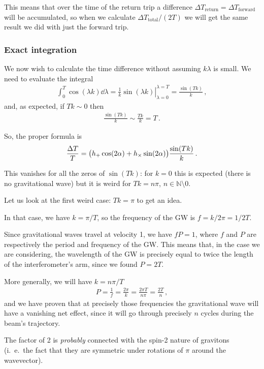 \documentclass[main.tex]{subfiles}
\begin{document}
This means that over the time of the return trip a difference \(\Delta T _{\text{return}} = \Delta T _{\text{forward}}\) will be accumulated, so when we calculate \(\Delta T _{\text{total}} / (2T)\) we will get the same result we did with just the forward trip. 

\subsubsection{Exact integration}

We now wish to calculate the time difference without assuming \(k \lambda \) is small. We need to evaluate the integral 
%
\begin{align}
\int_{0}^{T} \cos(\lambda k) \dd{\lambda } 
= \left. \frac{1}{k} \sin(\lambda k ) \right\vert_{\lambda = 0}^{\lambda = T} = \frac{\sin(Tk)}{k} 
\,,
\end{align}
%
and, as expected, if \(Tk \sim 0\) then 
%
\begin{align}
\frac{\sin(Tk)}{k} \sim \frac{Tk}{k} = T
\,.
\end{align}

So, the proper formula is 
%
\begin{align}
\frac{\Delta T}{T} = 
\qty(h_{+} \cos(2 \alpha ) + h_{ \times } \sin(2 \alpha ))
\frac{\sin(Tk)}{k}
\,.
\end{align}

This vanishes for all the zeros of \(\sin(Tk)\): for \(k=0\) this is expected (there is no gravitational wave) but it is weird for \(Tk = n \pi \), \(n \in \mathbb{N} \setminus \qty{0}\). 

Let us look at the first weird case: \(Tk = \pi \) to get an idea. 

In that case, we have \(k =  \pi / T \), so the frequency of the GW is \(f = k / 2 \pi  =  1/ 2 T\). 

Since gravitational waves travel at velocity 1, we have \(f P = 1\), where \(f\) and \(P\) are respectively the period and frequency of the GW. 
This means that, in the case we are considering, the wavelength of the GW is precisely equal to twice the length of the interferometer's arm, since we found \(P = 2T\). 

More generally, we will have \(k = n \pi /T\)
%
\begin{align}
P = \frac{1}{f} = \frac{2 \pi }{k} = \frac{2 \pi T}{n \pi } = \frac{2T}{n}
\,,
\end{align}
%
and we have proven that at precisely those frequencies the gravitational wave will have a vanishing net effect, since it will go through precisely \(n\) cycles during the beam's trajectory. 

The factor of 2 is \emph{probably} connected with the spin-2 nature of gravitons (i.\ e.\ the fact that they are symmetric under rotations of \(\pi \) around the wavevector).
\end{document}
